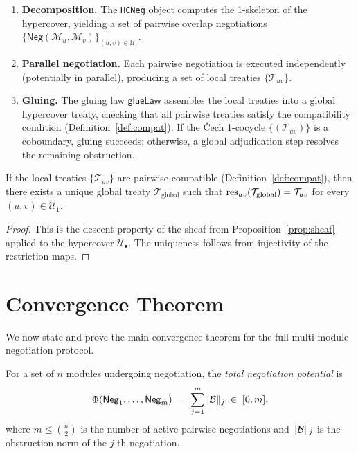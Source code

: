 \documentclass[11pt]{article}
\newcommand{\Trt}{\mathcal{T}}             %
\newcommand{\Neg}{\mathsf{Neg}}           %
\newcommand{\Mod}{\mathcal{M}}            %
\newcommand{\norm}[1]{\lVert #1 \rVert}  %
\newcommand{\ObsNorm}{\norm{\obstr}}      %
\newcommand{\gluelaw}{\mathsf{glueLaw}}   %
\begin{document}
\begin{enumerate}[leftmargin=*,noitemsep]
  \item \textbf{Decomposition.} The \texttt{HCNeg} object computes
    the 1-skeleton of the hypercover, yielding a set of pairwise
    overlap negotiations $\{\Neg(\Mod_u, \Mod_v)\}_{(u,v) \in \mathcal{U}_1}$.

  \item \textbf{Parallel negotiation.} Each pairwise negotiation
    is executed independently (potentially in parallel), producing
    a set of local treaties $\{\Trt_{uv}\}$.

  \item \textbf{Gluing.} The gluing law $\gluelaw$ assembles the
    local treaties into a global hypercover treaty, checking that
    all pairwise treaties satisfy the compatibility condition
    (Definition~\ref{def:compat}).  If the \v{C}ech 1-cocycle
    $\{(\Trt_{uv})\}$ is a coboundary, gluing succeeds; otherwise,
    a global adjudication step resolves the remaining obstruction.
\end{enumerate}

\begin{proposition}\label{prop:descent}
If the local treaties $\{\Trt_{uv}\}$ are pairwise compatible
(Definition~\ref{def:compat}), then there exists a unique global
treaty $\Trt_{\mathrm{global}}$ such that
$\res_{uv}(\Trt_{\mathrm{global}}) = \Trt_{uv}$ for every
$(u,v) \in \mathcal{U}_1$.
\end{proposition}

\begin{proof}
This is the descent property of the sheaf from
Proposition~\ref{prop:sheaf} applied to the hypercover
$\mathcal{U}_\bullet$.  The uniqueness follows from injectivity of the
restriction maps.
\end{proof}

\section{Convergence Theorem}\label{sec:convergence}

We now state and prove the main convergence theorem for the full
multi-module negotiation protocol.

\begin{definition}\label{def:potential}
For a set of $n$ modules undergoing negotiation, the
\emph{total negotiation potential} is
\[
  \Phi(\Neg_1, \ldots, \Neg_m) \;=\;
  \sum_{j=1}^{m} \ObsNorm_j \;\in\; [0, m],
\]
where $m \leq \binom{n}{2}$ is the number of active pairwise
negotiations and $\ObsNorm_j$ is the obstruction norm of the $j$-th
negotiation.
\end{definition}
\end{document}
